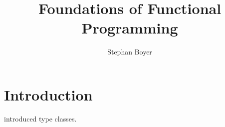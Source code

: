 \documentclass[oneside]{book}
\title{Foundations of Functional Programming}
\author{Stephan Boyer}
\date{}
\begin{document}
  

  \frontmatter

  \maketitle

  \tableofcontents

    \vspace{\fill}

    \begin{footnotesize}
      \noindent 
    \end{footnotesize}

  \mainmatter

  \chapter{Introduction}

    \citet{wadler89} introduced type classes.

  \backmatter

  

  \printindex
\end{document}
